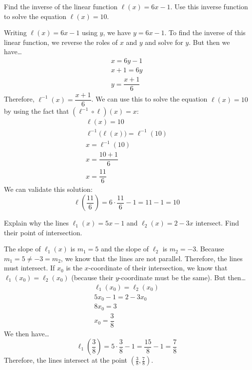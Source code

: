\documentclass[11pt,letterpaper]{article}
\begin{document}

 Find the inverse of the linear function $\ell(x)= 6x - 1$. Use this inverse function to solve the equation $\ell(x)= 10$. \pspace

\sol Writing $\ell(x)= 6x - 1$ using $y$, we have $y= 6x - 1$. To find the inverse of this linear function, we reverse the roles of $x$ and $y$ and solve for $y$. But then we have\dots
	\[
	\begin{gathered}
	x= 6y - 1 \\[0.3cm]
	x + 1= 6y \\[0.3cm]
	y= \dfrac{x + 1}{6}
	\end{gathered}
	\]
Therefore, $\ell^{-1}(x)= \dfrac{x + 1}{6}$. We can use this to solve the equation $\ell(x)= 10$ by using the fact that $(\ell^{-1} \circ \ell)(x)= x$:
	\[
	\begin{gathered}
	\ell(x)= 10 \\[0.3cm]
	\ell^{-1} \big( \ell(x) \big)= \ell^{-1}(10) \\[0.3cm]
	x= \ell^{-1}(10) \\[0.3cm]
	x= \dfrac{10 + 1}{6} \\[0.3cm]
	x= \dfrac{11}{6}
	\end{gathered}
	\] \pspace
We can validate this solution: 
	\[
	\ell \left( \dfrac{11}{6} \right)= 6 \cdot \dfrac{11}{6} - 1= 11 - 1= 10
	\]



\newpage



 Explain why the lines $\ell_1(x)= 5x - 1$ and $\ell_2(x)= 2 - 3x$ intersect. Find their point of intersection. \pspace

\sol The slope of $\ell_1(x)$ is $m_1= 5$ and the slope of $\ell_2$ is $m_2= -3$. Because $m_1= 5 \neq -3= m_2$, we know that the lines are not parallel. Therefore, the lines must intersect. If $x_0$ is the $x$-coordinate of their intersection, we know that $\ell_1(x_0)= \ell_2(x_0)$ (because their $y$-coordinate must be the same). But then\dots
	\[
	\begin{gathered}
	\ell_1(x_0)= \ell_2(x_0) \\[0.3cm]
	5x_0 - 1= 2 - 3x_0 \\[0.3cm]
	8x_0= 3 \\[0.3cm]
	x_0= \dfrac{3}{8}
	\end{gathered}
	\] \pspace
We then have\dots
	\[
	\ell_1 \left( \dfrac{3}{8} \right)= 5 \cdot \dfrac{3}{8} - 1= \dfrac{15}{8} - 1= \dfrac{7}{8}
	\] \pspace
Therefore, the lines intersect at the point $\left( \frac{3}{8}, \frac{7}{8} \right)$. 
\end{document}
